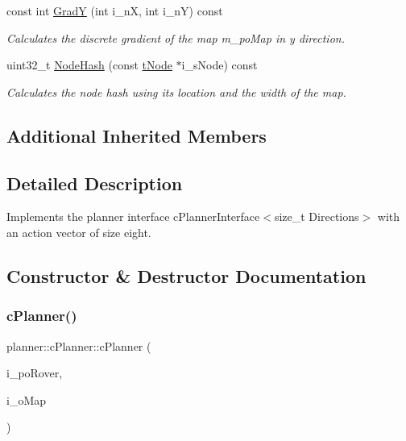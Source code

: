 \begin{DoxyCompactItemize}
\mbox{\label{classplanner_1_1c_planner_a6fd8e8632d78d85ce472322267ba7b36}} 
const int \mbox{\hyperlink{classplanner_1_1c_planner_a6fd8e8632d78d85ce472322267ba7b36}{GradY}} (int i\+\_\+nX, int i\+\_\+nY) const
\begin{DoxyCompactList}\small\item\em Calculates the discrete gradient of the map m\+\_\+po\+Map in y direction. \end{DoxyCompactList}\item 
uint32\+\_\+t \mbox{\hyperlink{classplanner_1_1c_planner_a5ae4464a4d418cda71f4a8133d592c93}{Node\+Hash}} (const \mbox{\hyperlink{structplanner_1_1t_node}{t\+Node}} $\ast$i\+\_\+s\+Node) const
\begin{DoxyCompactList}\small\item\em Calculates the node hash using its location and the width of the map. \end{DoxyCompactList}\end{DoxyCompactItemize}
\subsection*{Additional Inherited Members}


\subsection{Detailed Description}
Implements the planner interface c\+Planner\+Interface$<$size\+\_\+t Directions$>$ with an action vector of size eight. 

\subsection{Constructor \& Destructor Documentation}
\mbox{\label{classplanner_1_1c_planner_a4f425d47b277f000d34df04de9995274}} 
\subsubsection{\texorpdfstring{c\+Planner()}{cPlanner()}}
{\footnotesize\ttfamily planner\+::c\+Planner\+::c\+Planner (\begin{DoxyParamCaption}\item[{\mbox{\hyperlink{classplanner_1_1c_rover_interface}{c\+Rover\+Interface}}$<$ 8 $>$ $\ast$}]{i\+\_\+po\+Rover,  }\item[{\mbox{\hyperlink{classplanner_1_1c_graph}{c\+Graph}} \&}]{i\+\_\+o\+Map }\end{DoxyParamCaption})}



